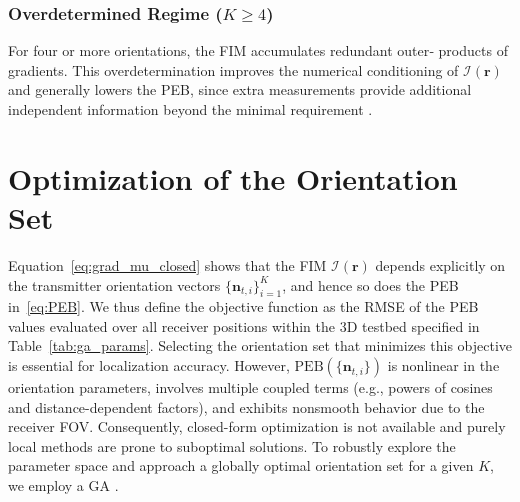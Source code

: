\documentclass[journal]{IEEEtran}
\begin{document}
\subsubsection{Overdetermined Regime (\(K\ge4\))}
For four or more orientations, the FIM accumulates redundant outer‐
products of gradients.  This overdetermination improves the numerical
conditioning of \(\mathcal{I}(\mathbf r)\) and generally lowers the PEB,
since extra measurements provide additional independent information
beyond the minimal requirement \cite{Ma2024,Wang2024b}. 


\section{Optimization of the Orientation Set}
\label{sec:optimization}

Equation~\eqref{eq:grad_mu_closed} shows that the FIM
\(\mathcal{I}(\mathbf r)\) depends explicitly on the transmitter orientation
vectors \(\{\mathbf n_{t,i}\}_{i=1}^{K}\), and hence so does the PEB
in~\eqref{eq:PEB}. We thus define the objective function as the RMSE of the PEB values evaluated over all receiver positions within the 3D testbed specified in Table~\ref{tab:ga_params}.
Selecting the orientation set that minimizes this objective is essential for localization accuracy. However, \(\mathrm{PEB}(\{\mathbf n_{t,i}\})\) is nonlinear in the orientation parameters, involves multiple coupled terms (e.g., powers of cosines and distance-dependent factors), and exhibits nonsmooth behavior due to the receiver FOV. Consequently, closed-form optimization is not available and purely local methods are prone to suboptimal solutions. To robustly explore the parameter space and approach a globally optimal orientation set for a given \(K\), we employ a GA \cite{Haupt2004}.
\end{document}
